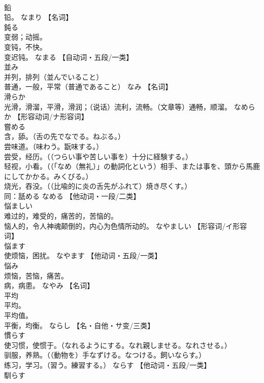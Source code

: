 \documentclass[8pt]{extreport}
\begin{document}
\begin{CJK}{UTF8}{min}
\\	鉛	
\\	铅。	なまり		【名词】
\\	鈍る	
\\	变弱；动摇。 
\\	变钝，不快。 
\\	变迟钝。	なまる		【自动词・五段/一类】
\\	並み	
\\	并列，排列（並んでいること） 
\\	普通，一般，平常（普通であること）	なみ		【名词】
\\	滑らか	
\\	光滑，滑溜，平滑，滑润；（说话）流利，流畅。（文章等）通畅，顺溜。	なめらか		【形容动词/ナ形容词】
\\	嘗める	
\\	含，舔。（舌の先でなでる。ねぶる。） 
\\	尝味道。（味わう。翫味する。） 
\\	尝受，经历。（（つらい事や苦しい事を）十分に経験する。） 
\\	轻视，小看。（（「なめ（無礼）」の動詞化という）相手、または事を、頭から馬鹿にしてかかる。みくびる。） 
\\	烧光，吞没。（（比喩的に炎の舌先がふれて）焼き尽くす。） 
\\	同：舐める	なめる		【他动词・一段/二类】
\\	悩ましい	
\\	难过的，难受的，痛苦的，苦恼的。 
\\	恼人的，令人神魂颠倒的，内心为色情所动的。	なやましい		【形容词/イ形容词】
\\	悩ます	
\\	使烦恼，困扰。	なやます		【他动词・五段/一类】
\\	悩み	
\\	烦恼，苦恼，痛苦。 
\\	病，病患。	なやみ		【名词】
\\	平均	
\\	平均。 
\\	平均值。 
\\	平衡，均衡。	ならし		【名・自他・サ变/三类】
\\	慣らす	
\\	使习惯，使惯于。（なれるようにする。なれ親しませる。なれさせる。） 
\\	驯服，养熟。（（動物を）手なずける。なつける。飼いならす。） 
\\	练习，学习。（習う。練習する。）	ならす		【他动词・五段/一类】
\\	馴らす	

\end{CJK}
\end{document}
